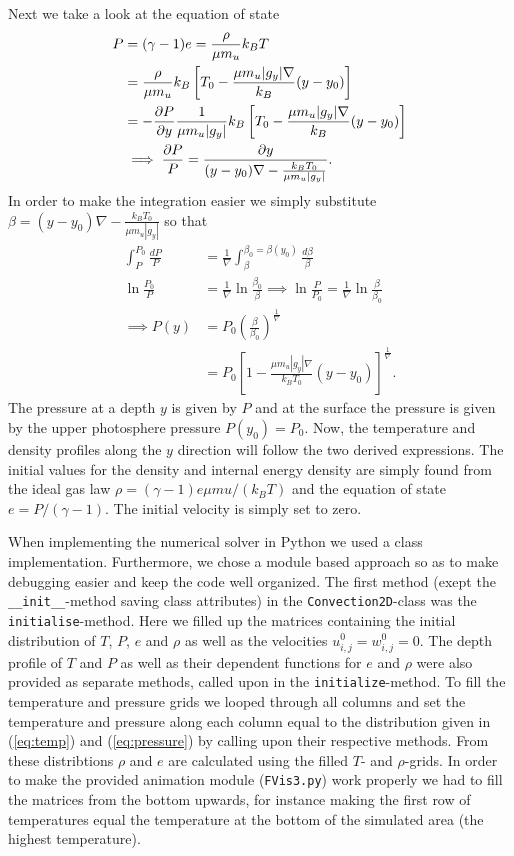 \documentclass{emulateapj}
\begin{document}
	Next we take a look at the equation of state 
	\begin{align}
		P &= (\gamma - 1)e = \frac{\rho}{\mu m_u}k_B T\\
		 &= \frac{\rho}{\mu m_u}k_B\left[T_0-\frac{\mu m_u |g_y|\nabla}{k_B}(y - y_0)\right]\\
		 &= -\pdv{P}{y}\frac{1}{\mu m_u |g_y|}k_B\left[T_0-\frac{\mu m_u |g_y|\nabla}{k_B}(y - y_0)\right]\\
		 &\implies \frac{\partial P}{P} = \frac{\partial y}{(y - y_0)\nabla - \frac{k_B T_0}{\mu m_u |g_y|}}.
	\end{align}
	In order to make the integration easier we simply substitute $ \beta = (y - y_0)\nabla - \frac{k_B T_0}{\mu m_u |g_y|}$ so that 
	\begin{align}
		\int_{P}^{P_0} \frac{dP}{P} &= \frac{1}{\nabla}\int_{\beta}^{\beta_0 = \beta(y_0)} \frac{d\beta}{\beta}\\
		\ln\frac{P_0}{P} &= \frac{1}{\nabla} \ln\frac{\beta_0}{\beta} \implies \ln\frac{P}{P_0} = \frac{1}{\nabla} \ln\frac{\beta}{\beta_0}\\
		\implies P(y) &= P_0 \left(\frac{\beta}{\beta_0}\right)^\frac{1}{\nabla}\\
		& = P_0 \left[1 - \frac{\mu m_u |g_y|\nabla}{k_B T_0}(y - y_0)\right]^\frac{1}{\nabla}.
		\label{eq:pressure}
	\end{align}
	The pressure at a depth $y$ is given by $P$ and at the surface the pressure is given by the upper photosphere pressure $P(y_0) = P_0$. Now, the temperature and density profiles along the $y$ direction will follow the two derived expressions. The initial values for the density and internal energy density are simply found from the ideal gas law $\rho = (\gamma - 1)e\mu mu / (k_B T)$ and the equation of state $e = P/(\gamma - 1)$. The initial velocity is simply set to zero.
	
	
	When implementing the numerical solver in Python we used a class implementation. Furthermore, we chose a module based approach so as to make debugging easier and keep the code well organized. The first method (exept the \texttt{\_\_init\_\_}-method saving class attributes) in the \texttt{Convection2D}-class was the \texttt{initialise}-method. Here we filled up the matrices containing the initial distribution of $T$, $P$, $e$ and $\rho$ as well as the velocities $u^0_{i,j} = w^0_{i,j} = 0$. The depth profile of $T$ and $P$ as well as their dependent functions for $e$ and $\rho$ were also provided as separate methods, called upon in the \texttt{initialize}-method. To fill the temperature and pressure grids we looped through all columns and set the temperature and pressure along each column equal to the distribution given in (\ref{eq:temp}) and (\ref{eq:pressure}) by calling upon their respective methods. From these distribtions $\rho$ and $e$ are calculated using the filled $T$- and $\rho$-grids. In order to make the provided animation module (\texttt{FVis3.py}) work properly we had to fill the matrices from the bottom upwards, for instance making the first row of temperatures equal the temperature at the bottom of the simulated area (the highest temperature). 
	
\end{document}
